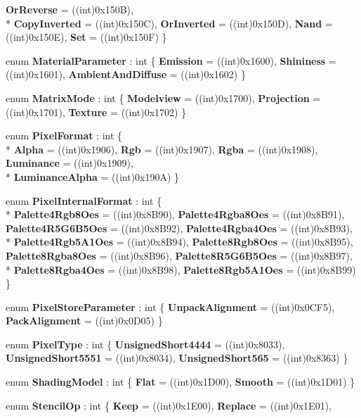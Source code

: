 \begin{DoxyCompactItemize}
{\bfseries Or\-Reverse} = ((int)0x150\-B), 
\\*
{\bfseries Copy\-Inverted} = ((int)0x150\-C), 
{\bfseries Or\-Inverted} = ((int)0x150\-D), 
{\bfseries Nand} = ((int)0x150\-E), 
{\bfseries Set} = ((int)0x150\-F)
 \}
\item 
enum {\bfseries Material\-Parameter} \-: int \{ {\bfseries Emission} = ((int)0x1600), 
{\bfseries Shininess} = ((int)0x1601), 
{\bfseries Ambient\-And\-Diffuse} = ((int)0x1602)
 \}
\item 
enum {\bfseries Matrix\-Mode} \-: int \{ {\bfseries Modelview} = ((int)0x1700), 
{\bfseries Projection} = ((int)0x1701), 
{\bfseries Texture} = ((int)0x1702)
 \}
\item 
enum {\bfseries Pixel\-Format} \-: int \{ \\*
{\bfseries Alpha} = ((int)0x1906), 
{\bfseries Rgb} = ((int)0x1907), 
{\bfseries Rgba} = ((int)0x1908), 
{\bfseries Luminance} = ((int)0x1909), 
\\*
{\bfseries Luminance\-Alpha} = ((int)0x190\-A)
 \}
\item 
enum {\bfseries Pixel\-Internal\-Format} \-: int \{ \\*
{\bfseries Palette4\-Rgb8\-Oes} = ((int)0x8\-B90), 
{\bfseries Palette4\-Rgba8\-Oes} = ((int)0x8\-B91), 
{\bfseries Palette4\-R5\-G6\-B5\-Oes} = ((int)0x8\-B92), 
{\bfseries Palette4\-Rgba4\-Oes} = ((int)0x8\-B93), 
\\*
{\bfseries Palette4\-Rgb5\-A1\-Oes} = ((int)0x8\-B94), 
{\bfseries Palette8\-Rgb8\-Oes} = ((int)0x8\-B95), 
{\bfseries Palette8\-Rgba8\-Oes} = ((int)0x8\-B96), 
{\bfseries Palette8\-R5\-G6\-B5\-Oes} = ((int)0x8\-B97), 
\\*
{\bfseries Palette8\-Rgba4\-Oes} = ((int)0x8\-B98), 
{\bfseries Palette8\-Rgb5\-A1\-Oes} = ((int)0x8\-B99)
 \}
\item 
enum {\bfseries Pixel\-Store\-Parameter} \-: int \{ {\bfseries Unpack\-Alignment} = ((int)0x0\-C\-F5), 
{\bfseries Pack\-Alignment} = ((int)0x0\-D05)
 \}
\item 
enum {\bfseries Pixel\-Type} \-: int \{ {\bfseries Unsigned\-Short4444} = ((int)0x8033), 
{\bfseries Unsigned\-Short5551} = ((int)0x8034), 
{\bfseries Unsigned\-Short565} = ((int)0x8363)
 \}
\item 
enum {\bfseries Shading\-Model} \-: int \{ {\bfseries Flat} = ((int)0x1\-D00), 
{\bfseries Smooth} = ((int)0x1\-D01)
 \}
\item 
enum {\bfseries Stencil\-Op} \-: int \{ {\bfseries Keep} = ((int)0x1\-E00), 
{\bfseries Replace} = ((int)0x1\-E01), 

\end{DoxyCompactItemize}
